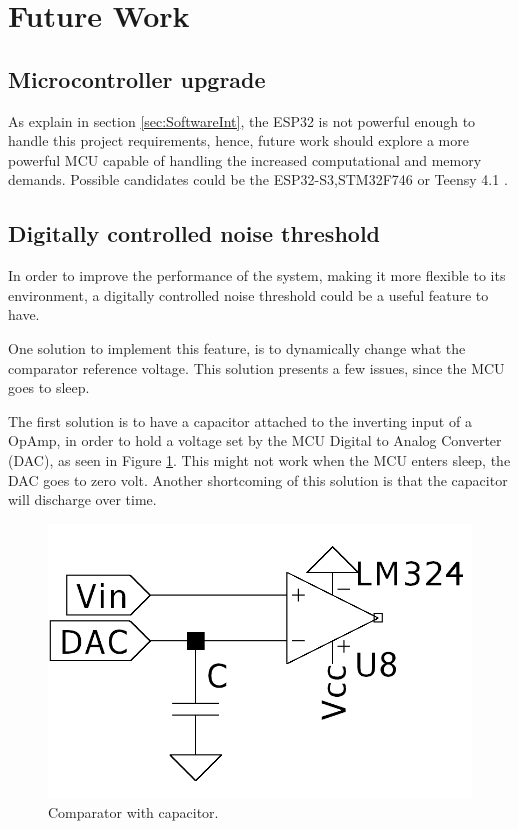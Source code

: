 \section{Future Work}


\subsection{Microcontroller upgrade}

As explain in section \ref{sec:SoftwareInt}, the ESP32 is not powerful enough to handle this project requirements, hence, future work should explore a more powerful MCU capable of handling the increased computational and memory demands. Possible candidates could be the ESP32-S3,STM32F746 or Teensy 4.1 .

\subsection{Digitally controlled noise threshold }

In order to improve the performance of the system, making it more flexible to its environment, a digitally controlled noise threshold could be a useful feature to have. 

One solution to implement this feature, is to dynamically change what the comparator reference voltage. This solution presents a few issues, since the MCU goes to sleep.

The first solution is to have a capacitor attached to the inverting input of a OpAmp, in order to hold a voltage set by the MCU Digital to Analog Converter (DAC), as seen in Figure \ref{fig:CompCap}. This might not work when the MCU enters sleep, the DAC goes to zero volt. Another shortcoming of this solution is that the capacitor will discharge over time. 

\begin{figure}[H]
    \centering
    \includegraphics*[scale = 0.3]{Images/ComparatorCap.png}
    \caption{Comparator with capacitor.}
    \label{fig:CompCap}
\end{figure}

